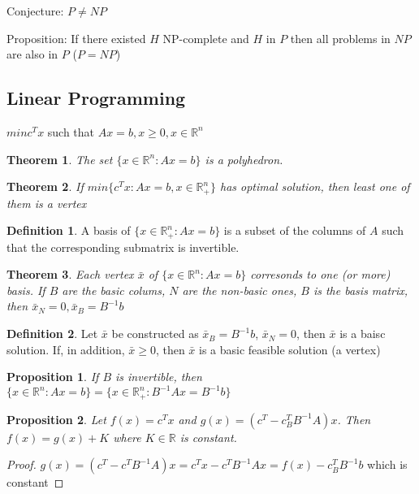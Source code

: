 \documentclass{article}
\theoremstyle{plain}
\newtheorem{thm}{Theorem}
\newtheorem{prop}{Proposition}
\theoremstyle{definition}
\newtheorem{defn}{Definition}
\begin{document}
Conjecture: $P\ne NP$

Proposition: If there existed $H$ NP-complete and $H$ in $P$
then all problems in $NP$ are also in $P$ ($P=NP$)

\subsection{Linear Programming}
$min c^Tx$ such that $Ax = b, x\geq 0, x \in \mathbb{R}^n$

\begin{thm}
    The set $\{x\in\mathbb{R}^n: Ax = b\}$ is a polyhedron.
\end{thm}

\begin{thm}
    If $min\{c^Tx:Ax = b, x\in\mathbb{R}^n_+\}$ has optimal
    solution, then least one of them is a vertex
\end{thm}

\begin{defn}
    A basis of $\{x\in\mathbb{R}^n_+: Ax = b\}$ is a subset
    of the columns of $A$ such that the corresponding
    submatrix is invertible.
\end{defn}

\begin{thm}
   Each vertex $\bar{x}$ of $\{x\in\mathbb{R}^n: Ax = b\}$
   corresonds to one (or more) basis. If $B$ are the basic
    colums, $N$ are the non-basic ones, $B$ is the basis
    matrix, then $\bar{x}_N = 0, \bar{x}_B = B^{-1}b$
\end{thm}

\begin{defn}
    Let $\bar{x}$ be constructed as $\bar{x}_B = B^{-1}b$,
    $\bar{x}_N = 0$, then $\bar{x}$ is a baisc solution.
    If, in addition, $\bar{x} \geq 0$, then $\bar{x}$ is
    a basic feasible solution (a vertex)
\end{defn}

\begin{prop}
    If $B$ is invertible, then $\{x\in\mathbb{R}^n: Ax = b\}
    = \{x\in\mathbb{R}^n_+: B^{-1}Ax = B^{-1}b\}$
\end{prop}

\begin{prop}
    Let $f(x) = c^Tx$ and $g(x) = (c^T - c_B^TB^{-1}A)x$. Then
    $f(x) = g(x) + K$ where $K\in\mathbb{R}$ is constant.
\end{prop}

\begin{proof}
    $g(x) = (c^T - c^TB^{-1}A)x = c^Tx - c^TB^{-1}Ax = f(x) - c^T_BB^{-1}b$ which is constant
\end{proof}
\end{document}
